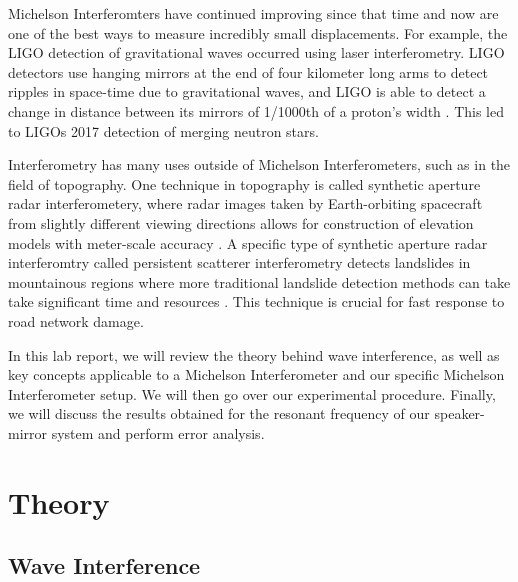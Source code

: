 \documentclass[11pt,letterpaper]{article}
\begin{document}
Michelson Interferomters have continued improving since that time and now are one of the best ways to measure incredibly small displacements. For example, the LIGO detection of gravitational waves occurred using laser interferometry. LIGO detectors use hanging mirrors at the end of four kilometer long arms to detect ripples in space-time due to gravitational waves, and LIGO is able to detect a change in distance between its mirrors of 1/1000th of a proton's width \cite{LIGO}. This led to LIGOs 2017 detection of merging neutron stars.

Interferometry has many uses outside of Michelson Interferometers, such as in the field of topography. One technique in topography is called synthetic aperture radar interferometery, where radar images taken by Earth-orbiting spacecraft from slightly different viewing directions allows for construction of elevation models with meter-scale accuracy \cite{Bürgmann}. A specific type of synthetic aperture radar interferomtry called persistent scatterer interferometry detects landslides in mountainous regions where more traditional landslide detection methods can take take significant time and resources \cite{Nefros}. This technique is crucial for fast response to road network damage.

In this lab report, we will review the theory behind wave interference, as well as key concepts applicable to a Michelson Interferometer and our specific Michelson Interferometer setup. We will then go over our experimental procedure. Finally, we will discuss the results obtained for the resonant frequency of our speaker-mirror system and perform error analysis.


\section{Theory}

\subsection{Wave Interference}
\end{document}
